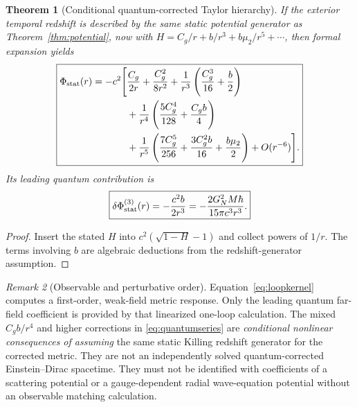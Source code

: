 \documentclass[11pt,a4paper]{article}
\newtheorem{theorem}{Theorem}[section]
\theoremstyle{remark}
\newtheorem{remark}[theorem]{Remark}
\begin{document}
\begin{theorem}[Conditional quantum-corrected Taylor hierarchy]\label{thm:quantumseries}
If the exterior temporal redshift is described by the same static
potential generator as Theorem~\ref{thm:potential}, now with
$H=C_g/r+b/r^3+b\mu_2/r^5+\cdots$, then formal expansion yields
\begin{equation}\label{eq:quantumseries}
\boxed{\begin{aligned}
\Phi_{\rm stat}(r)=-c^2\Bigg[&\frac{C_g}{2r}
+\frac{C_g^2}{8r^2}
+\frac{1}{r^3}\left(\frac{C_g^3}{16}+\frac b2\right)\\
&+\frac{1}{r^4}\left(\frac{5C_g^4}{128}
+\frac{C_gb}{4}\right)\\
&+\frac{1}{r^5}\left(\frac{7C_g^5}{256}
+\frac{3C_g^2b}{16}+\frac{b\mu_2}{2}\right)
+O(r^{-6})\Bigg].
\end{aligned}}
\end{equation}
Its leading quantum contribution is
\begin{equation}\label{eq:leadingquantumphi}
\boxed{\delta\Phi_{\rm stat}^{(3)}(r)
=-\frac{c^2b}{2r^3}
=-\frac{2G_N^2M\hbar}{15\pi c^3r^3}.}
\end{equation}
\end{theorem}
\begin{proof}
Insert the stated $H$ into $c^2(\sqrt{1-H}-1)$ and collect powers of
$1/r$. The terms involving $b$ are algebraic deductions from the
redshift-generator assumption.\end{proof}
\begin{remark}[Observable and perturbative order]
Equation~\eqref{eq:loopkernel} computes a first-order, weak-field
metric response. Only the leading quantum far-field coefficient is
provided by that linearized one-loop calculation. The mixed $C_gb/r^4$
and higher corrections in \eqref{eq:quantumseries} are \emph{conditional
nonlinear consequences of assuming} the same static Killing redshift
generator for the corrected metric. They are not an independently solved
quantum-corrected Einstein--Dirac spacetime. They must not be identified
with coefficients of a scattering potential or a gauge-dependent radial
wave-equation potential without an observable matching calculation.
\end{remark}
\end{document}
